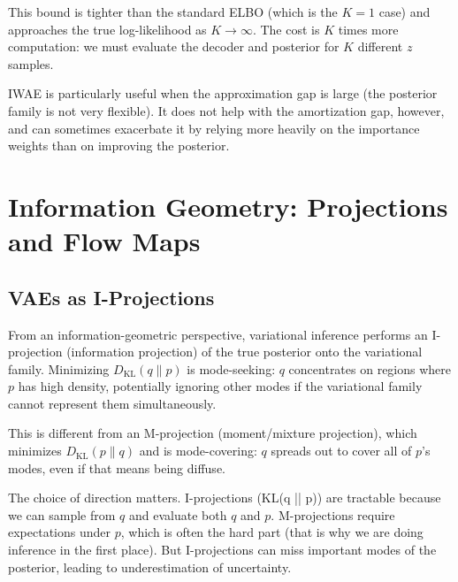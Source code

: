 \vspace{0.3cm}

This bound is tighter than the standard ELBO (which is the $K=1$ case) and approaches the true log-likelihood as $K \to \infty$. The cost is $K$ times more computation: we must evaluate the decoder and posterior for $K$ different $z$ samples.

\vspace{0.3cm}

IWAE is particularly useful when the approximation gap is large (the posterior family is not very flexible). It does not help with the amortization gap, however, and can sometimes exacerbate it by relying more heavily on the importance weights than on improving the posterior.

\vspace{2em}

\section{Information Geometry: Projections and Flow Maps}
\label{sec:info_geometry}

\vspace{1em}

\subsection{VAEs as I-Projections}

From an information-geometric perspective, variational inference performs an I-projection (information projection) of the true posterior onto the variational family. Minimizing $D_{\text{KL}}(q \| p)$ is mode-seeking: $q$ concentrates on regions where $p$ has high density, potentially ignoring other modes if the variational family cannot represent them simultaneously.

\vspace{0.3cm}

This is different from an M-projection (moment/mixture projection), which minimizes $D_{\text{KL}}(p \| q)$ and is mode-covering: $q$ spreads out to cover all of $p$'s modes, even if that means being diffuse.

\vspace{0.3cm}

The choice of direction matters. I-projections (KL(q || p)) are tractable because we can sample from $q$ and evaluate both $q$ and $p$. M-projections require expectations under $p$, which is often the hard part (that is why we are doing inference in the first place). But I-projections can miss important modes of the posterior, leading to underestimation of uncertainty.

